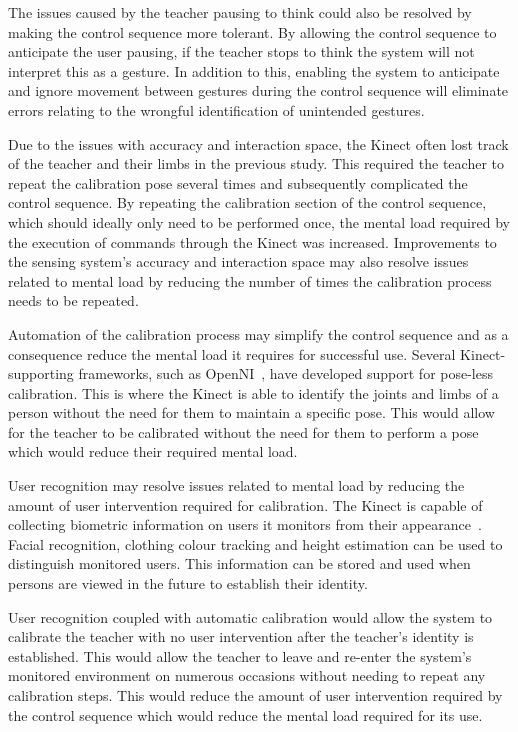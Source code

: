 \documentclass[link]{IWCOMP}
\begin{document}
The issues caused by the teacher pausing to think could also be resolved by making the control sequence more tolerant.
By allowing the control sequence to anticipate the user pausing, if the teacher stops to think the system will not interpret this as a gesture.
In addition to this, enabling the system to anticipate and ignore movement between gestures during the control sequence will eliminate errors relating to the wrongful identification of unintended gestures.

Due to the issues with accuracy and interaction space, the Kinect often lost track of the teacher and their limbs in the previous study.
This required the teacher to repeat the calibration pose several times and subsequently complicated the control sequence.
By repeating the calibration section of the control sequence, which should ideally only need to be performed once, the mental load required by the execution of commands through the Kinect was increased.
Improvements to the sensing system's accuracy and interaction space may also resolve issues related to mental load by reducing the number of times the calibration process needs to be repeated.

Automation of the calibration process may simplify the control sequence and as a consequence reduce the mental load it requires for successful use.
Several Kinect-supporting frameworks, such as OpenNI~\cite{Organisation2011}, have developed support for pose-less calibration.
This is where the Kinect is able to identify the joints and limbs of a person without the need for them to maintain a specific pose.
This would allow for the teacher to be calibrated without the need for them to perform a pose which would reduce their required mental load.

User recognition may resolve issues related to mental load by reducing the amount of user intervention required for calibration.
The Kinect is capable of collecting biometric information on users it monitors from their appearance~\cite{Leyvand2011}.
Facial recognition, clothing colour tracking and height estimation can be used to distinguish monitored users.
This information can be stored and used when persons are viewed in the future to establish their identity.

User recognition coupled with automatic calibration would allow the system to calibrate the teacher with no user intervention after the teacher's identity is established.
This would allow the teacher to leave and re-enter the system's monitored environment on numerous occasions without needing to repeat any calibration steps.
This would reduce the amount of user intervention required by the control sequence which would reduce the mental load required for its use.
\end{document}
